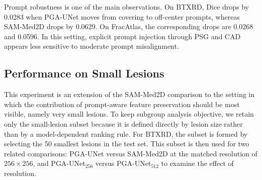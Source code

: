 \documentclass{ieeeaccess}
\begin{document}
\begin{table}
\caption{Dice comparison with fine-tuned SAM-Med2D at $256\times256$.}
\label{tab:sam}
\centering
{}
\end{table}

Prompt robustness is one of the main observations. On BTXRD, Dice drops by 0.0283 when PGA-UNet moves from covering to off-center prompts, whereas SAM-Med2D drops by 0.0629. On FracAtlas, the corresponding drops are 0.0268 and 0.0596. In this setting, explicit prompt injection through PSG and CAD appears less sensitive to moderate prompt misalignment.


\subsection{Performance on Small Lesions}
This experiment is an extension of the SAM-Med2D comparison to the setting in which the contribution of prompt-aware feature preservation should be most visible, namely very small lesions. To keep subgroup analysis objective, we retain only the small-lesion subset because it is defined directly by lesion size rather than by a model-dependent ranking rule. For BTXRD, the subset is formed by selecting the 50 smallest lesions in the test set. This subset is then used for two related comparisons: PGA-UNet versus SAM-Med2D at the matched resolution of $256\times256$, and PGA-UNet$_{256}$ versus PGA-UNet$_{512}$ to examine the effect of resolution.

\begin{table}
\caption{Dice on the 50 smallest lesions in the BTXRD test set.}
\label{tab:small}
\centering
{}
\end{table}
\end{document}
